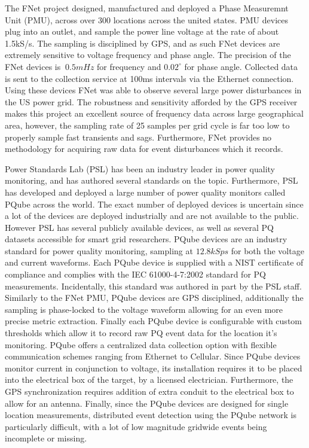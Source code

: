 The FNet project designed, manufactured and deployed a Phase Measuremnt Unit (PMU), across over 300 locations across the united states.\cite{zhang2010wide} PMU devices plug into an outlet, and sample the power line voltage at the rate of about 1.5kS/s.
The sampling is disciplined by GPS, and as such FNet devices are extremely sensitive to voltage frequency and phase angle.
The precision of the FNet devices is $~0.5mHz$ for frequency and $0.02^{\circ}$ for phase angle.
Collected data is sent to the collection service at 100ms intervals via the Ethernet connection.
Using these devices FNet was able to observe several large power disturbances in the US power grid.
The robustness and sensitivity afforded by the GPS receiver makes this project an excellent source of frequency data across large geographical area, however, the sampling rate of 25 samples per grid cycle is far too low to properly sample fast transients and sags.
Furthermore, FNet provides no methodology for acquiring raw data for event disturbances which it records.

Power Standards Lab (PSL) has been an industry leader in power quality monitoring, and has authored several standards on the topic.
Furthermore, PSL has developed and deployed a large number of power quality monitors called PQube across the world.
The exact number of deployed devices is uncertain since a lot of the devices are deployed industrially and are not available to the public.
However PSL has several publicly available devices, as well as several PQ datasets accessible for smart grid researchers.
PQube devices are an industry standard for power quality monitoring, sampling at $12.8kSps$ for both the voltage and current waveforms.\cite{pqube_spec} Each PQube device is supplied with a NIST certificate of compliance and complies with the IEC 61000-4-7:2002 standard for PQ measurements.
Incidentally, this standard was authored in part by the PSL staff.
Similarly to the FNet PMU, PQube devices are GPS disciplined, additionally the sampling is phase-locked to the voltage waveform allowing for an even more precise metric extraction.
Finally each PQube device is configurable with custom thresholds which allow it to record raw PQ event data for the location it's monitoring.
PQube offers a centralized data collection option with flexible communication schemes ranging from Ethernet to Cellular.
Since PQube devices monitor current in conjunction to voltage, its installation requires it to be placed into the electrical box of the target, by a licensed electrician.\cite{von2014micro} Furthermore, the GPS synchronization requires addition of extra conduit to the electrical box to allow for an antenna.
Finally, since the PQube devices are designed for single location measurements, distributed event detection using the PQube network is particularly difficult, with a lot of low magnitude gridwide events being incomplete or missing.



